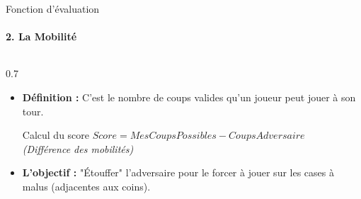 \documentclass[10pt, aspectratio=169]{beamer}
\begin{document}
\begin{frame}{Fonction d'évaluation}
    \framesubtitle{2. La Mobilité}
    \begin{columns}[T]
        \begin{column}{0.7\textwidth}
            \vspace{0.1cm}
            \begin{itemize}
                \item \textbf{Définition :} C'est le nombre de coups valides qu'un joueur peut jouer à son tour.
                \vspace{0.5cm}
                \begin{block}{Calcul du score}
                    \centering
                    \vspace{0.2cm}
                    \normalsize \textbf{$Score = MesCoupsPossibles - CoupsAdversaire$} \\
                    \vspace{0.1cm}
                    \footnotesize \textit{(Différence des mobilités)}
                \end{block}
                \vspace{0.5cm}
                \item \textbf{L'objectif :} "Étouffer" l'adversaire pour le forcer à jouer sur les cases à malus (adjacentes aux coins).
            \end{itemize}
        \end{column}

    \end{columns}
\end{frame}
\end{document}
